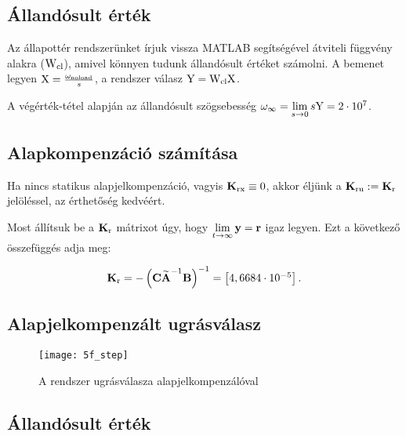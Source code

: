\subsection{Állandósult érték}\label{subsec:5d}

Az állapottér rendszerünket írjuk vissza MATLAB segítségével átviteli függvény
alakra ($\mathrm{W}_\text{cl}$), amivel könnyen tudunk állandósult értéket számolni.
A bemenet legyen $\mathrm{X} = \frac{\omega_\text{noload}}{s}$, a rendszer válasz $\mathrm{Y} = \mathrm{W}_\text{cl}\mathrm{X}$.

A végérték-tétel alapján az állandósult szögsebesség $\omega_\infty = \lim\limits_{s\rightarrow 0}s\mathrm{Y} = 2\cdot10^7$.%


\subsection{Alapkompenzáció számítása}

Ha nincs statikus alapjelkompenzáció, vagyis $\boldsymbol{\mathrm{K}}_\text{rx}\equiv0$, akkor éljünk
a $\boldsymbol{\mathrm{K}}_\text{ru}:=\boldsymbol{\mathrm{K}}_\text{r}$ jelöléssel, az érthetőség kedvéért.

Most állítsuk be a $\boldsymbol{\mathrm{K}}_\text{r}$ mátrixot úgy, hogy
$\lim\limits_{t\rightarrow\infty}\boldsymbol{\mathrm{y}}=\boldsymbol{\mathrm{r}}$ igaz legyen.
Ezt a következő összefüggés adja meg:

\begin{equation}
	\boldsymbol{\mathrm{K}}_\text{r} = -\left(\boldsymbol{\mathrm{C}}\widetilde{\boldsymbol{\mathrm{A}}}^{-1}\boldsymbol{\mathrm{B}}\right)^{-1} = \begin{bmatrix}4,6684\cdot10^{-5}\end{bmatrix}.
\end{equation}


\subsection{Alapjelkompenzált ugrásválasz}

\begin{figure}[H]
	\centering
	\texttt{[image: 5f\_step]}
	\caption{A rendszer ugrásválasza alapjelkompenzálóval}
	\label{fig:5f_step}
\end{figure}


\subsection{Állandósult érték}


